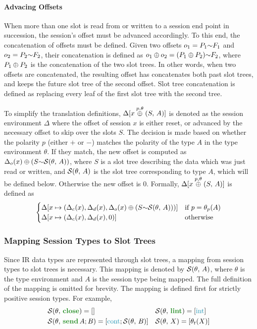 \documentclass[sigconf,nonacm,natbib=true]{acmart}
\begin{document}
\paragraph{Advacing Offsets}

When more than one slot is read from or written to a session end point in succession, the session's offset must be advanced accordingly. To this end, the concatenation of offsets must be defined. Given two offsets $o_1 = P_1\text{$\sim$}F_1$ and $o_2 = P_2\text{$\sim$}F_2$, their concatenation is defined as $o_1\oplus o_2 = (P_1\oplus P_2)\text{$\sim$}F_2$, where $P_1\oplus P_2$ is the concatenation of the two slot trees. In other words, when two offsets are concatenated, the resulting offset has concatenates both past slot trees, and keeps the future slot tree of the second offset. Slot tree concatenation is defined as replacing every leaf of the first slot tree with the second tree.

To simplify the translation definitions, $\Delta[x \overset{p,\theta}{\oplus} (S,\,A)]$ is denoted as the session environment $\Delta$ where the offset of session $x$ is either reset, or advanced by the necessary offset to skip over the slots $S$. The decision is made based on whether the polarity $p$ (either $+$ or $-$) matches the polarity of the type $A$ in the type environment $\theta$. If they match, the new offset is computed as $\Delta_o(x)\oplus(S\text{$\sim$}\mathcal{S}(\theta,\,A))$, where $S$ is a slot tree describing the data which was just read or written, and $\mathcal{S}(\theta,\,A)$ is the slot tree corresponding to type $A$, which will be defined below. Otherwise the new offset is $0$. Formally, $\Delta[x \overset{p,\theta}{\oplus} (S,\,A)]$ is defined as
\[\begin{cases}
    \Delta[x \mapsto (\Delta_c(x), \Delta_d(x), \Delta_o(x)\oplus(S\text{$\sim$}\mathcal{S}(\theta,\,A)))] & \text{if } p = \theta_{p}(A) \\
    \Delta[x \mapsto (\Delta_c(x), \Delta_d(x), 0)] & \text{otherwise}
\end{cases}\]

\subsubsection{Mapping Session Types to Slot Trees} \label{subsubsection:MappingSessionTypesToSlots}

Since \ac{IR} data types are represented through slot trees, a mapping from session types to slot trees is necessary. This mapping is denoted by $\mathcal{S}(\theta,\,A)$, where $\theta$ is the type environment and $A$ is the session type being mapped. The full definition of the mapping is omitted for brevity. The mapping is defined first for strictly positive session types. For example,
\[\begin{aligned}&\slots{\theta}{\closet} = \nilst
  &&\slots{\theta}{\lintt} = \seqst{\ints} \\ &\slots{\theta}{\sendt{A}{B}} = \seqst{\conts; \slots{\theta}{B}} &&\slots{\theta}{X} = \seqst{\typeidof{\theta}{X}}\\
\end{aligned}\]
\end{document}
